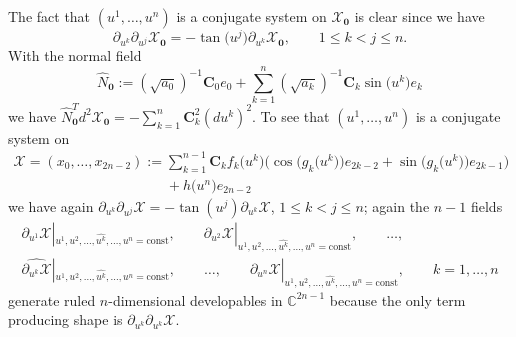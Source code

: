 \documentclass[pdftex]{sigma}
\begin{document}
The fact that $(u^1,\dots ,u^n)$ is a conjugate system on
$\mathcal{X}_{\mathbf{0}}$ is clear since we have
\[
\partial_{u^k}\partial_{u^j}\mathcal{X}_\mathbf{0}=
-\tan\big(u^j\big)\partial_{u^k}\mathcal{X}_\mathbf{0},\qquad 1\le k<j\le n.
\]
With the normal f\/ield
\[
\hat
N_{\mathbf{0}}:=(\sqrt{a_0})^{-1}\mathbf{C}_0e_0+
\sum_{k=1}^n(\sqrt{a_k})^{-1}\mathbf{C}_k\sin\big(u^k\big)e_k
\]
we have $\hat
N_{\mathbf{0}}^Td^2\mathcal{X}_{\mathbf{0}}=-\sum\limits_{k=1}^n\mathbf{C}_k^2(du^k)^2$.
To see that $(u^1,\dots ,u^n)$ is a conjugate system on
\begin{gather*}
\mathcal{X}=(x_0,\dots ,x_{2n-2}):=\sum_{k=1}^{n-1}\mathbf{C}_kf_k\big(u^k\big)\big(\cos\big(g_k\big(u^k\big)\big)e_{2k-2}
+\sin\big(g_k\big(u^k\big)\big)e_{2k-1}\big)\\
\phantom{\mathcal{X}=(x_0,\dots ,x_{2n-2}):=}{} +h\big(u^n\big)e_{2n-2}
\end{gather*}
we have again
$\partial_{u^k}\partial_{u^j}\mathcal{X}=-\tan(u^j)\partial_{u^k}\mathcal{X}$, $1\le k<j\le n$; again the $n-1$ f\/ields
\begin{gather*}
\partial_{u^1}\mathcal{X}|_{u^1,u^2,\dots ,\widehat{u^k},\dots ,u^n=\mathrm{const}},\qquad
\partial_{u^2}\mathcal{X}|_{u^1,u^2,\dots ,\widehat{u^k},\dots ,u^n=\mathrm{const}},\qquad
\dots ,\\
\widehat{\partial_{u^k}\mathcal{X}}|_{u^1,u^2,\dots ,\widehat{u^k},\dots ,u^n=\mathrm{const}},\qquad
\dots ,
\qquad
\partial_{u^n}\mathcal{X}|_{u^1,u^2,\dots ,\widehat{u^k},\dots ,u^n=\mathrm{const}},\qquad
k=1,\dots ,n
\end{gather*}
generate ruled $n$-dimensional developables in $\mathbb{C}^{2n-1}$
because the only term producing shape is
$\partial_{u^k}\partial_{u^k}\mathcal{X}$.
\end{document}
